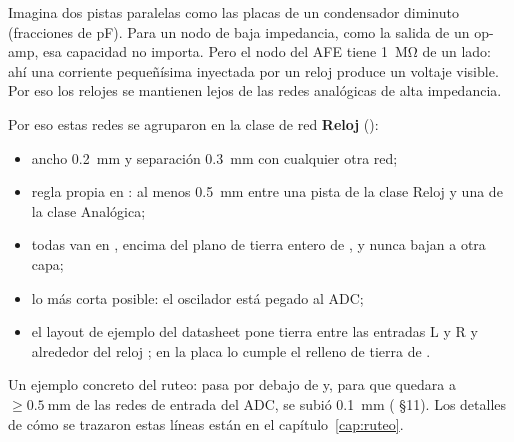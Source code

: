 \begin{idea}
Imagina dos pistas paralelas como las placas de un condensador diminuto (fracciones de pF). Para un nodo de baja impedancia, como la salida de un op-amp, esa capacidad no importa. Pero el nodo  del AFE tiene \SI{1}{\mega\ohm} de un lado: ahí una corriente pequeñísima inyectada por un reloj produce un voltaje visible. Por eso los relojes se mantienen lejos de las redes analógicas de alta impedancia.
\end{idea}

Por eso estas redes se agruparon en la clase de red \textbf{Reloj} ():
\begin{itemize}
  \item ancho \SI{0.2}{\milli\meter} y separación \SI{0.3}{\milli\meter} con cualquier otra red;
  \item regla propia  en : al menos \SI{0.5}{\milli\meter} entre una pista de la clase Reloj y una de la clase Analógica;
  \item todas van en , encima del plano de tierra entero de , y nunca bajan a otra capa;
  \item {} lo más corta posible: el oscilador está pegado al ADC;
  \item el layout de ejemplo del datasheet pone tierra entre las entradas L y R y alrededor del reloj ; en la placa lo cumple el relleno de tierra de .
\end{itemize}

Un ejemplo concreto del ruteo:  pasa por debajo de  y, para que quedara a $\ge\SI{0.5}{\milli\meter}$ de las redes de entrada del ADC,  se subió \SI{0.1}{\milli\meter} ( §11). Los detalles de cómo se trazaron estas líneas están en el capítulo~\ref{cap:ruteo}.

